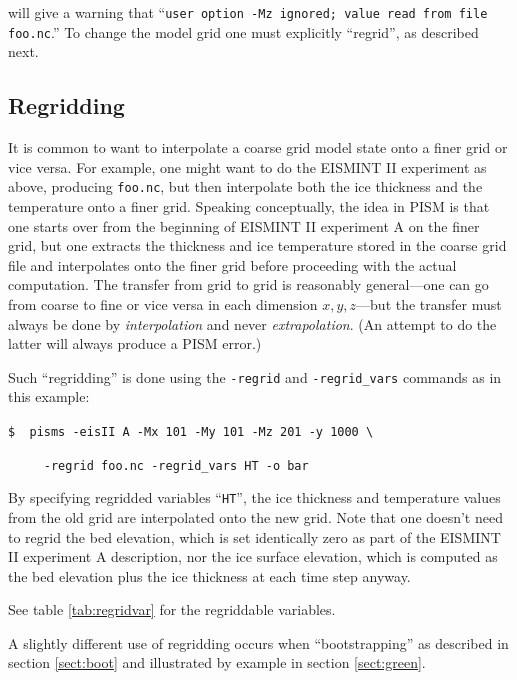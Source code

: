 \documentclass[11pt,final]{amsart}
\begin{document}
\noindent will give a warning that ``\verb|user option -Mz ignored; value read from file foo.nc|.''  To change the model grid one must explicitly ``regrid'', as described next.

\subsection{Regridding}  It is common to want to interpolate a coarse grid model state onto a finer grid or vice versa.  For example, one might want to do the EISMINT II experiment as above, producing \verb|foo.nc|, but then interpolate both the ice thickness and the temperature onto a finer grid.  Speaking conceptually, the idea in PISM is that one starts over from the beginning of EISMINT II experiment A on the finer grid, but one extracts the thickness and ice temperature stored in the coarse grid file and interpolates onto the finer grid before proceeding with the actual computation.  The transfer from grid to grid is reasonably general---one can go from coarse to fine or vice versa in each dimension $x,y,z$---but the transfer must always be done by \emph{interpolation} and never \emph{extrapolation}.  (An attempt to do the latter will always produce a PISM error.)

Such ``regridding'' is done using the \verb|-regrid| and \verb|-regrid_vars| commands as in this example:

\verb|$  pisms -eisII A -Mx 101 -My 101 -Mz 201 -y 1000 \|

\verb|     -regrid foo.nc -regrid_vars HT -o bar|

\noindent By specifying regridded variables ``\verb|HT|'', the ice thickness and temperature values from the old grid are interpolated onto the new grid.  Note that one doesn't need to regrid the bed elevation, which is set identically zero as part of the EISMINT II experiment A description, nor the ice surface elevation, which is computed as the bed elevation plus the ice thickness at each time step anyway.

See table \ref{tab:regridvar} for the regriddable variables.

A slightly different use of regridding occurs when ``bootstrapping'' as described in section \ref{sect:boot} and illustrated by example in section \ref{sect:green}.
\end{document}

